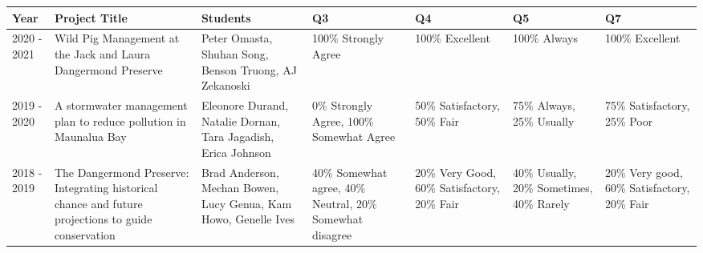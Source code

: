 
\begin{longtable}{p{1cm}p{2.5cm}p{3cm}p{2cm}p{2cm}p{2cm}p{2cm}}
Year & Project Title & Students & Q3 & Q4 & Q5 & Q7\\
\hline 
\endhead 
2020 - 2021 & Wild Pig Management at the Jack and Laura Dangermond Preserve & Peter Omasta, Shuhan Song, Benson Truong, AJ Zekanoski & 100\% Strongly Agree & 100\% Excellent & 100\% Always & 100\% Excellent \\ 
2019 - 2020 & A stormwater management plan to reduce pollution in Maunalua Bay & Eleonore Durand, Natalie Dornan, Tara Jagadish, Erica Johnson & 0\% Strongly Agree, 100\% Somewhat Agree & 50\% Satisfactory, 50\% Fair & 75\% Always, 25\% Usually & 75\% Satisfactory, 25\% Poor \\ 
2018 - 2019 & The Dangermond Preserve: Integrating historical chance and future projections to guide conservation & Brad Anderson, Mechan Bowen, Lucy Genua, Kam Howo, Genelle Ives & 40\% Somewhat agree, 40\% Neutral, 20\% Somewhat disagree & 20\% Very Good, 60\% Satisfactory, 20\% Fair & 40\% Usually, 20\% Sometimes, 40\% Rarely & 20\% Very good, 60\% Satisfactory, 20\% Fair \\ 
\end{longtable}


